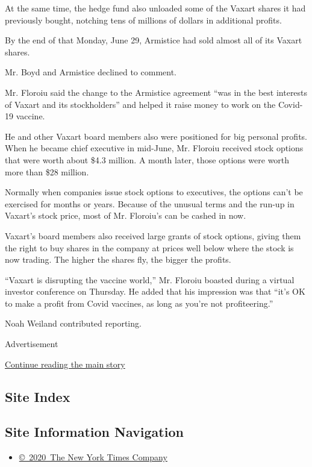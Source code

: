 At the same time, the hedge fund also unloaded some of the Vaxart shares
it had previously bought, notching tens of millions of dollars in
additional profits.

By the end of that Monday, June 29, Armistice had sold almost all of its
Vaxart shares.

Mr. Boyd and Armistice declined to comment.

Mr. Floroiu said the change to the Armistice agreement ``was in the best
interests of Vaxart and its stockholders'' and helped it raise money to
work on the Covid-19 vaccine.

He and other Vaxart board members also were positioned for big personal
profits. When he became chief executive in mid-June, Mr. Floroiu
received stock options that were worth about \$4.3 million. A month
later, those options were worth more than \$28 million.

Normally when companies issue stock options to executives, the options
can't be exercised for months or years. Because of the unusual terms and
the run-up in Vaxart's stock price, most of Mr. Floroiu's can be cashed
in now.

Vaxart's board members also received large grants of stock options,
giving them the right to buy shares in the company at prices well below
where the stock is now trading. The higher the shares fly, the bigger
the profits.

``Vaxart is disrupting the vaccine world,'' Mr. Floroiu boasted during a
virtual investor conference on Thursday. He added that his impression
was that ``it's OK to make a profit from Covid vaccines, as long as
you're not profiteering.''

Noah Weiland contributed reporting.

Advertisement

\protect\hyperlink{after-bottom}{Continue reading the main story}

\hypertarget{site-index}{%
\subsection{Site Index}\label{site-index}}

\hypertarget{site-information-navigation}{%
\subsection{Site Information
Navigation}\label{site-information-navigation}}

\begin{itemize}
\tightlist
\item
  \href{https://help.nytimes3xbfgragh.onion/hc/en-us/articles/115014792127-Copyright-notice}{©~2020~The
  New York Times Company}
\end{itemize}

